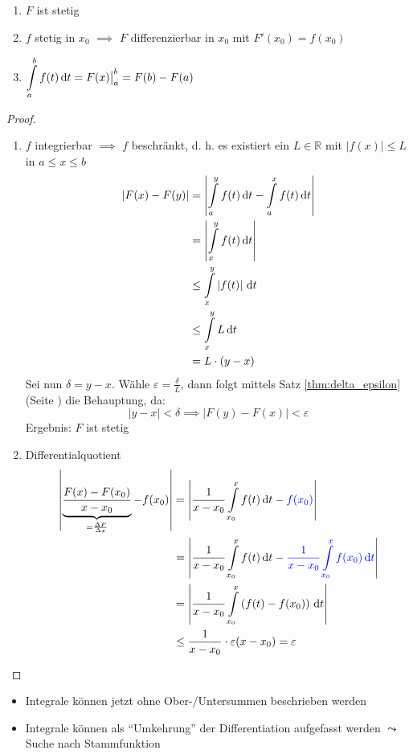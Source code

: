 \begin{theorem}
  \begin{enumerate}
    \item $F$ ist stetig
    \item $f$ stetig in $x_0$ $\implies$ $F$ differenzierbar in $x_0$ mit $F'(x_0) = f(x_0)$
    \item $\displaystyle \int\limits_a^b f(t)\,\mathrm d t = F(x)\big|_a^b = F(b) - F(a)$
  \end{enumerate}
\end{theorem}

\begin{proof}
  \begin{enumerate}
    \item $f$ integrierbar $\implies$ $f$ beschränkt, d. h. es existiert ein $L \in \mathbb R$ mit $\left|f(x)\right| \leq L$ in $a\leq x \leq b$
      \begin{align*}
        \left| F(x) - F(y) \right| &= \left| \int\limits_a^y f(t)\,\mathrm d t - \int\limits_a^x f(t)\,\mathrm d t \right|\\
        &= \left| \int\limits_x^y f(t)\,\mathrm d t \right |\\
        &\leq \int\limits_x^y \left| f(t) \right| \,\mathrm d t\\
        &\leq \int\limits_x^y L\,\mathrm d t\\
        &= L\cdot (y-x)
      \end{align*}
      Sei nun $\delta = y-x$. Wähle $\varepsilon = \frac \delta L$, dann folgt mittels Satz \ref{thm:delta_epsilon} (Seite \pageref{thm:delta_epsilon}) die Behauptung, da:
      \[ \left| y - x \right| < \delta \implies \left| F(y) - F(x) \right| < \varepsilon \]
      Ergebnis: $F$ ist stetig
    \item Differentialquotient
      \begin{align*}
        \left| \underbrace{\frac{F(x)-F(x_0)}{x-x_0}}_{= \frac{\Delta F}{\Delta x}} - f(x_0) \right|
        &= \left| \frac{1}{x-x_0} \int\limits_{x_0}^x f(t)\,\mathrm d t - \textcolor{blue}{f(x_0)} \right|\\
        &= \left| \frac{1}{x-x_0} \int\limits_{x_0}^x f(t)\,\mathrm d t - \textcolor{blue}{\frac 1 {x-x_0} \int\limits_{x_0}^x f(x_0)\,\mathrm d t} \right| \\
        &= \left| \frac{1}{x-x_0} \int\limits_{x_0}^x \left( f(t) - f(x_0) \right) \,\mathrm d t \right| \\
        &\leq \frac{1}{x-x_0} \cdot \varepsilon (x-x_0) = \varepsilon
      \end{align*}
  \end{enumerate}
\end{proof}

\begin{note}
  \begin{itemize}
    \item Integrale können jetzt ohne Ober-/Untersummen beschrieben werden
    \item Integrale können als "`Umkehrung"' der Differentiation aufgefasst werden $\leadsto$ Suche nach Stammfunktion
  \end{itemize}
\end{note}
